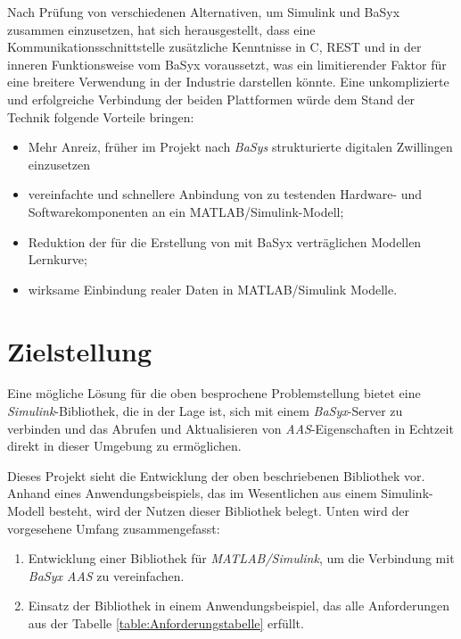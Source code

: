 Nach Prüfung von verschiedenen Alternativen, um Simulink und BaSyx zusammen einzusetzen, hat sich herausgestellt, dass eine Kommunikationsschnittstelle zusätzliche Kenntnisse in C, REST und in der inneren Funktionsweise vom BaSyx voraussetzt, was ein limitierender Faktor für eine breitere Verwendung in der Industrie darstellen könnte. Eine unkomplizierte und erfolgreiche Verbindung der beiden Plattformen würde dem Stand der Technik folgende Vorteile bringen:

\begin{itemize}
    \item Mehr Anreiz, früher im Projekt nach \textit{BaSys} strukturierte digitalen Zwillingen einzusetzen
    \item vereinfachte und schnellere Anbindung von zu testenden Hardware- und Softwarekomponenten an ein MATLAB/Simulink-Modell;
    \item Reduktion der für die Erstellung von mit BaSyx verträglichen Modellen Lernkurve;
    \item wirksame Einbindung realer Daten in MATLAB/Simulink Modelle.  
\end{itemize}

\section{Zielstellung}

Eine mögliche Lösung für die oben besprochene Problemstellung bietet eine \textit{Simulink}-Bibliothek, die in der Lage ist, sich mit einem \textit{BaSyx}-Server zu verbinden und das Abrufen und Aktualisieren von \textit{AAS}-Eigenschaften in Echtzeit direkt in dieser Umgebung zu ermöglichen.

Dieses Projekt sieht die Entwicklung der oben beschriebenen Bibliothek vor. Anhand eines Anwendungsbeispiels, das im Wesentlichen aus einem Simulink-Modell besteht, wird der Nutzen dieser Bibliothek belegt. Unten wird der vorgesehene Umfang zusammengefasst:

\begin{enumerate}
    \item Entwicklung einer Bibliothek für \textit{MATLAB/Simulink}, um die Verbindung mit \textit{BaSyx AAS} zu vereinfachen.
    \item Einsatz der Bibliothek in einem Anwendungsbeispiel, das alle Anforderungen aus der Tabelle \ref{table:Anforderungstabelle} erfüllt.
\end{enumerate}

